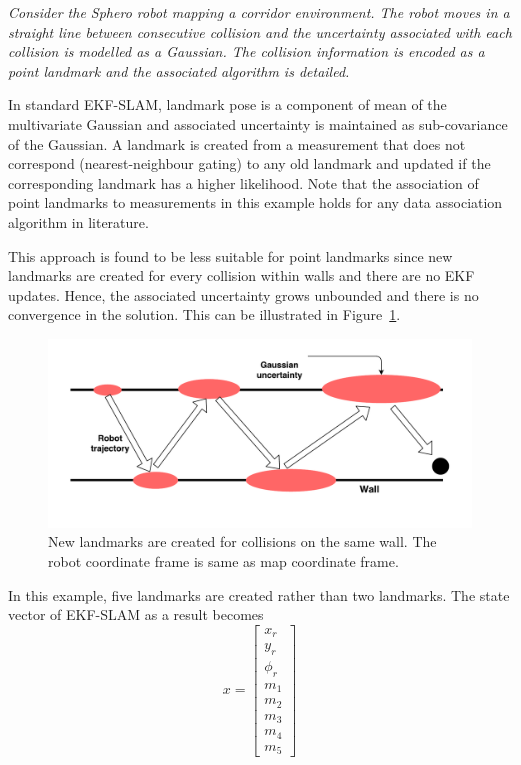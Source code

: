 \begin{exmp} {\it Consider the Sphero robot mapping a corridor environment. The robot moves in a straight line between consecutive collision and the uncertainty associated with each collision is modelled as a Gaussian. The collision information is encoded as a point landmark and the associated algorithm is detailed.}

\qquad In standard EKF-SLAM, landmark pose is a component of mean of the multivariate Gaussian and associated uncertainty is maintained as sub-covariance of the Gaussian. A landmark is created from a measurement that does not correspond (nearest-neighbour gating) to any old landmark and updated if the corresponding landmark has a higher likelihood. Note that the association of point landmarks to measurements in this example holds for any data association algorithm in literature.

This approach is found to be less suitable for point landmarks since new landmarks are created for every collision within walls and there are no EKF updates. Hence, the associated uncertainty grows unbounded and there is no convergence in the solution. This can be illustrated in Figure~\ref{ex1_pl}. 

\begin{figure}
\centering
\includegraphics[scale=0.5]{./images/ex1_pointlandmark}
\caption[A simple point landmark representation]{New landmarks are created for collisions on the same wall. The robot coordinate frame is same as map coordinate frame.}
\label{ex1_pl}
\end{figure}  

In this example, five landmarks are created rather than two landmarks. The state vector of EKF-SLAM as a result becomes
\begin{equation}
x=\begin{bmatrix}x_r \\ y_r \\ \phi_r \\ m_1 \\ m_2 \\ m_3 \\ m_4 \\ m_5 \end{bmatrix}
\end{equation}


\end{exmp}
